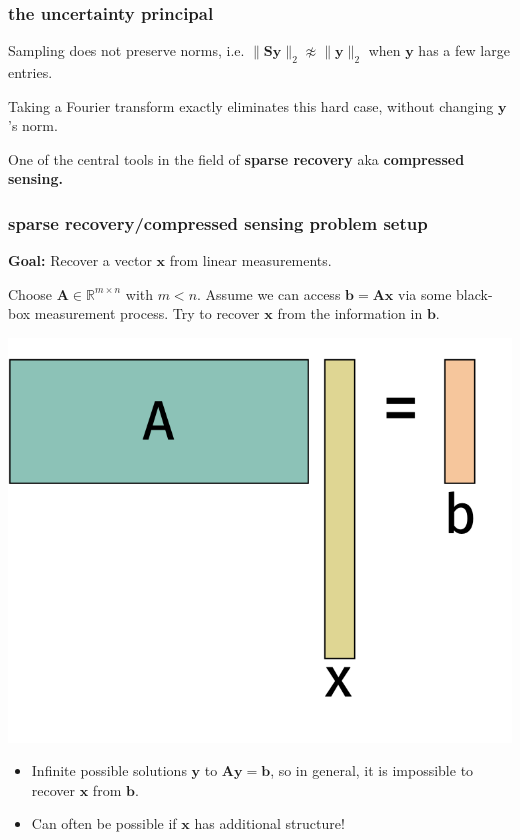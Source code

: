 \documentclass[compress]{beamer}
\newcommand{\bv}[1]{\mathbf{#1}}
\newcommand{\R}{\mathbb{R}}
\begin{document}
\begin{frame}
	\frametitle{the uncertainty principal}
	Sampling does not preserve norms, i.e. $\|\bv{S}\bv{y}\|_2 \not\approx \|\bv{y}\|_2$ when $\bv{y}$ has a few large entries. 
	
	Taking a Fourier transform exactly eliminates this hard case, without changing $\bv{y}$'s norm.
	
	\begin{center}
		One of the central tools in the field of \alert{\textbf{sparse recovery}} aka \alert{\textbf{compressed sensing.}}
	\end{center}
\end{frame}

\begin{frame}
	\frametitle{sparse recovery/compressed sensing problem setup}
	\textbf{Goal:} Recover a vector $\bv{x}$ from linear measurements.

	Choose $\bv{A}\in\R^{m \times n}$ with $m < n$. Assume we can access $\bv{b} = \bv{A}\bv{x}$ via some black-box measurement process. Try to recover $\bv{x}$ from the information in $\bv{b}$. 
	\begin{center}
		\includegraphics[width=.4\textwidth]{underdetermined.png}
	\end{center}
	\vspace{-1em}
	\begin{itemize}
		\item Infinite possible solutions $\bv{y}$ to $\bv{A}\bv{y} = \bv{b}$, so in general, it is impossible to recover $\bv{x}$ from $\bv{b}$. 
		\item Can often be possible if $\bv{x}$ has additional structure!
	\end{itemize}
\end{frame}
\end{document}

